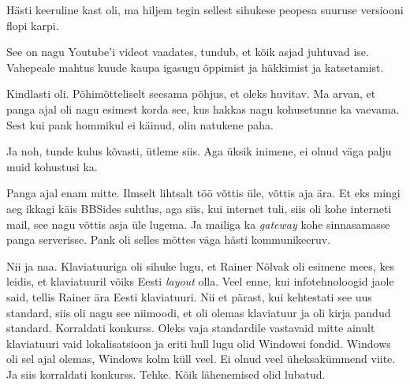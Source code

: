 Hästi keeruline kast oli, ma hiljem tegin  sellest sihukese peopesa suuruse versiooni flopi karpi.


See on nagu Youtube'i videot vaadates, tundub, et  kõik asjad juhtuvad ise. Vahepeale mahtus kuude kaupa igasugu õppimist ja häkkimist ja katsetamist.


Kindlasti oli. Põhimõtteliselt seesama põhjus, et oleks huvitav. Ma arvan, et panga ajal oli nagu esimest korda  see, kus hakkas nagu kohusetunne ka vaevama. Sest kui pank  hommikul ei käinud, olin natukene paha.

Ja noh, tunde kulus kõvasti, ütleme siis. Aga üksik inimene,  ei olnud  väga palju muid kohustusi ka.


Panga ajal enam mitte. Ilmselt lihtsalt töö võttis üle,  võttis aja ära. Et eks mingi aeg ikkagi käis BBSides suhtlus, aga siis, kui internet tuli, siis oli kohe interneti mail, see nagu võttis asja üle lugema. Ja mailiga ka \emph{gateway} kohe sinnasamasse panga serverisse. Pank oli selles mõttes väga hästi kommunikeeruv.


Nii ja naa. Klaviatuuriga oli sihuke lugu, et Rainer Nõlvak oli esimene mees, kes leidis, et klaviatuuril võiks Eesti \emph{layout} olla. Veel enne, kui infotehnoloogid jaole said, tellis Rainer ära Eesti klaviatuuri. Nii et pärast, kui kehtestati see uus standard, siis oli nagu see niimoodi, et oli olemas klaviatuur ja oli kirja pandud standard. Korraldati konkurss. Oleks vaja standardile vastavaid mitte ainult klaviatuuri vaid lokalisatsioon ja eriti hull lugu olid Windowsi fondid. Windows oli sel ajal olemas, Windows kolm küll veel. Ei olnud veel üheksakümmend viite. Ja siis korraldati konkurss. Tehke. Kõik lähenemised olid lubatud.


